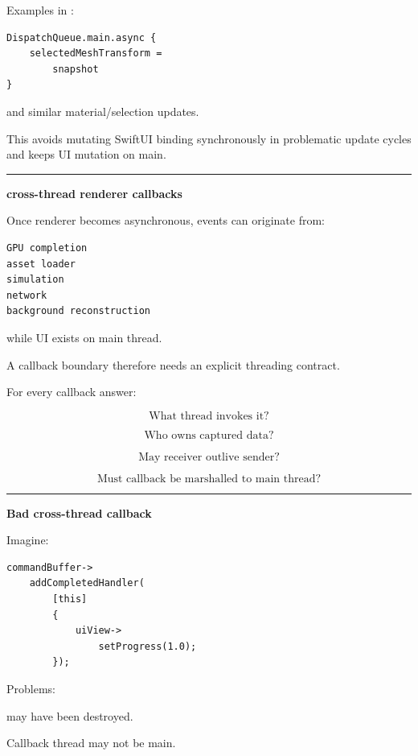Examples in :

\begin{verbatim}
DispatchQueue.main.async {
    selectedMeshTransform =
        snapshot
}
\end{verbatim}

and similar material/selection updates.

This avoids mutating SwiftUI binding synchronously in problematic update cycles and keeps UI mutation on main.

\begin{center}\rule{0.5\linewidth}{0.5pt}\end{center}

\textbf{cross-thread renderer callbacks}

Once renderer becomes asynchronous, events can originate from:

\begin{verbatim}
GPU completion
asset loader
simulation
network
background reconstruction
\end{verbatim}

while UI exists on main thread.

A callback boundary therefore needs an explicit threading contract.

For every callback answer:

\[
\boxed{
\text{What thread invokes it?}
}
\]

\[
\boxed{
\text{Who owns captured data?}
}
\]

\[
\boxed{
\text{May receiver outlive sender?}
}
\]

\[
\boxed{
\text{Must callback be marshalled to main thread?}
}
\]

\begin{center}\rule{0.5\linewidth}{0.5pt}\end{center}

\textbf{Bad cross-thread callback}

Imagine:

\begin{verbatim}
commandBuffer->
    addCompletedHandler(
        [this]
        {
            uiView->
                setProgress(1.0);
        });
\end{verbatim}

Problems:

 may have been destroyed.

Callback thread may not be main.


